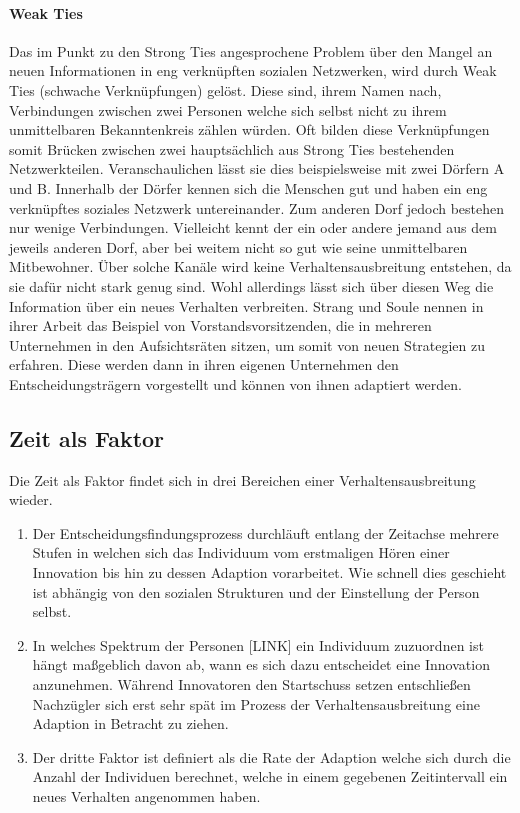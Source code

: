 \documentclass[12pt]{article}
\begin{document}
\paragraph{Weak Ties}
Das im Punkt zu den Strong Ties angesprochene Problem über den Mangel an neuen Informationen in eng verknüpften sozialen Netzwerken, wird durch Weak Ties (schwache Verknüpfungen) gelöst. Diese sind, ihrem Namen nach, Verbindungen zwischen zwei Personen welche sich selbst nicht zu ihrem unmittelbaren Bekanntenkreis zählen würden. Oft bilden diese Verknüpfungen somit Brücken zwischen zwei hauptsächlich aus Strong Ties bestehenden Netzwerkteilen. Veranschaulichen lässt sie dies beispielsweise mit zwei Dörfern A und B. Innerhalb der Dörfer kennen sich die Menschen gut und haben ein eng verknüpftes soziales Netzwerk untereinander. Zum anderen Dorf jedoch bestehen nur wenige Verbindungen. Vielleicht kennt der ein oder andere jemand aus dem jeweils anderen Dorf, aber bei weitem nicht so gut wie seine unmittelbaren Mitbewohner. Über solche Kanäle wird keine Verhaltensausbreitung entstehen, da sie dafür nicht stark genug sind. Wohl allerdings lässt sich über diesen Weg die Information über ein neues Verhalten verbreiten. Strang und Soule \cite{strang98} nennen in ihrer Arbeit das Beispiel von Vorstandsvorsitzenden, die in mehreren Unternehmen in den Aufsichtsräten sitzen, um somit von neuen Strategien zu erfahren. Diese werden dann in ihren eigenen Unternehmen den Entscheidungsträgern vorgestellt und können von ihnen adaptiert werden.
\subsection{Zeit als Faktor}
Die Zeit als Faktor findet sich in drei Bereichen einer Verhaltensausbreitung wieder.
\begin{enumerate}
\item Der Entscheidungsfindungsprozess durchläuft entlang der Zeitachse mehrere Stufen in welchen sich das Individuum vom erstmaligen Hören einer Innovation bis hin zu dessen Adaption vorarbeitet. Wie schnell dies geschieht ist abhängig von den sozialen Strukturen und der Einstellung der Person selbst.
\item In welches Spektrum der Personen [LINK] ein Individuum zuzuordnen ist hängt maßgeblich davon ab, wann es sich dazu entscheidet eine Innovation anzunehmen. Während Innovatoren den Startschuss setzen entschließen Nachzügler sich erst sehr spät im Prozess der Verhaltensausbreitung eine Adaption in Betracht zu ziehen.
\item Der dritte Faktor ist definiert als die Rate der Adaption welche sich durch die Anzahl der Individuen berechnet, welche in einem gegebenen Zeitintervall ein neues Verhalten angenommen haben.
\end{enumerate}
\end{document}

